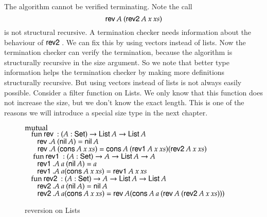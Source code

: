 The algorithm cannot be verified terminating.
Note the call 
\[\mathsf{rev}\: A \: (\mathsf{rev2}\: A \: x \: xs)\]
is not structural recursive.
A termination checker needs information about the behaviour of $\mathsf{rev2}\:$.
We can fix this by using vectors instead of lists. Now the termination checker can verify the termination, because the algorithm is structurally recursive in the size argument.
So we note that better type information helps the termination checker by making more definitions structurally recursive.
But using vectors instead of lists is not always easily possible.
Consider a filter function on Lists. We only know that this function does not increase the size, but
we don't know the exact length.
This is one of the reasons we will introduce a special size type in the next chapter.

\begin{figure}
$\mathrm{mutual}\: $  \\
$ \hspace*{3mm} \mathrm{fun}\: \mathsf{rev}\: : ( A : \mathsf{Set} ) \rightarrow{\mathsf{List}\:A \rightarrow\mathsf{List}\:A} $ \\
$ \spc \spc \rev .A \: (\nil A ) = \nil A$\\
$ \spc \spc \rev .A \: (\cons A \:x  \: xs) = \cons A \: (\reva A \: x \: xs) (\revb A \: x \: xs)$\\
$\ \hspace*{3mm} \mathrm{fun}\: \mathsf{rev1}\: : ( A  : \mathsf{Set} ) \rightarrow{A  \rightarrow\mathsf{List}\:A \rightarrow A}$\\
$ \spc \spc \reva .A \: a \: (\nil A ) = a$ \\
$\spc \spc \reva .A \: a (\cons A \: x \: xs) = \reva A \: x \: xs$\\
$\hspace*{3mm} \mathrm{fun}\: \mathsf{rev2}\: : ( A : \mathsf{Set} ) \rightarrow{ A \rightarrow\mathsf{List}\:A \rightarrow\mathsf{List}\:A} $\\
$\spc \spc \revb .A \: a \: (\nil A ) = \nil A $\\
$\spc \spc \revb .A \: a (\cons A\:  x \: xs) = \rev A (\cons A \: a \: (\rev A \: (\revb A \: x \: xs)))$
\caption{reversion on Lists}  
\end{figure}

